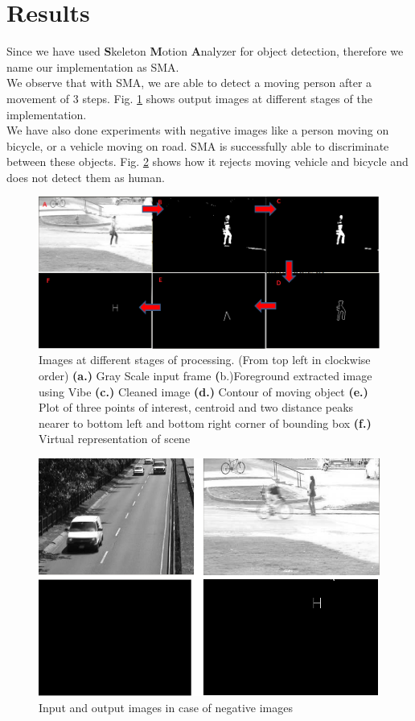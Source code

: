 \documentclass[conference]{IEEEtran}
\begin{document}
\section{Results}
Since we have used \textbf{S}keleton \textbf{M}otion \textbf{A}nalyzer
for object detection, therefore we name our implementation as SMA.\\
\indent We observe that with SMA, we are able to detect a moving person
after a movement of 3 steps. Fig.  \ref{pipeline_images} shows output
images at different stages of the implementation.\\
\indent We have also done experiments with negative images like a person
moving on bicycle, or a vehicle moving on road. SMA is successfully able
to discriminate between these objects. Fig. \ref{negative_inputs} shows
how it rejects moving vehicle and bicycle and  does not detect them as
human.\\
\begin{figure}[!h]
\centering
\includegraphics[scale=0.30]{figures/pipeline_images}
\caption{Images at different stages of processing. (From top left in
clockwise order) \textbf{(a.)} Gray Scale input frame 
\textbf({b.)}Foreground extracted image using Vibe \textbf{(c.)} Cleaned
image \textbf{(d.)} Contour of moving object \textbf{(e.)} Plot of three points
of interest, centroid and two distance peaks nearer to bottom left and
bottom right corner of bounding box \textbf{(f.)} Virtual representation
of scene} 
\label{pipeline_images}
\end{figure}

\begin{figure}[!h]
\centering
\includegraphics[scale=0.30]{figures/negative_inputs}
\caption{Input and output images in case of negative images}
\label{negative_inputs}
\end{figure}
\end{document}
